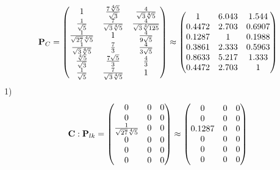 \documentclass[10pt,a4paper]{article}
\begin{document}
	\[
		\bold{P}_{C} = 
		\begin{pmatrix}
			{1} {} & \frac{{7}\sqrt[4]{5}} {\sqrt{3}} & \frac{{4}} {\sqrt{3}\sqrt[4]{5}} \\
			\frac{1} {\sqrt{5}} & \frac{{7}} {\sqrt{3}\sqrt[4]{5}} & \frac{{4}} {\sqrt{3}\sqrt[4]{125}} \\
			\frac{1} {\sqrt{27}\sqrt[4]{5}} & {1} {} & \frac{{4}} {{9}\sqrt{5}} \\
			\frac{1} {\sqrt{3}\sqrt[4]{5}} & \frac{{7}} {{3}} & \frac{{4}} {{3}\sqrt{5}} \\
			\frac{\sqrt[4]{5}} {\sqrt{3}} & \frac{{7}\sqrt{5}} {{3}} & \frac{{4}} {{3}} \\
			\frac{1} {\sqrt{5}} & \frac{{7}} {\sqrt{3}\sqrt[4]{5}} & {1} {} \\
		\end{pmatrix}
		\approx
		\begin{pmatrix}
			1        & 6.043    & 1.544    \\
			0.4472   & 2.703    & 0.6907   \\
			0.1287   & 1        & 0.1988   \\
			0.3861   & 2.333    & 0.5963   \\
			0.8633   & 5.217    & 1.333    \\
			0.4472   & 2.703    & 1        \\
		\end{pmatrix}
	\]
	1)
	\[
		\bold{C}: \bold{P}_{lk} = 
		\begin{pmatrix}
			{{0}} {} & {{0}} {} & {{0}} {} \\
			{{0}} {} & {{0}} {} & {{0}} {} \\
			\frac{1} {\sqrt{27}\sqrt[4]{5}} & {{0}} {} & {{0}} {} \\
			{{0}} {} & {{0}} {} & {{0}} {} \\
			{{0}} {} & {{0}} {} & {{0}} {} \\
			{{0}} {} & {{0}} {} & {{0}} {} \\
		\end{pmatrix}
		\approx
		\begin{pmatrix}
			0        & 0        & 0        \\
			0        & 0        & 0        \\
			0.1287   & 0        & 0        \\
			0        & 0        & 0        \\
			0        & 0        & 0        \\
			0        & 0        & 0        \\
		\end{pmatrix}
	\]
\end{document}

